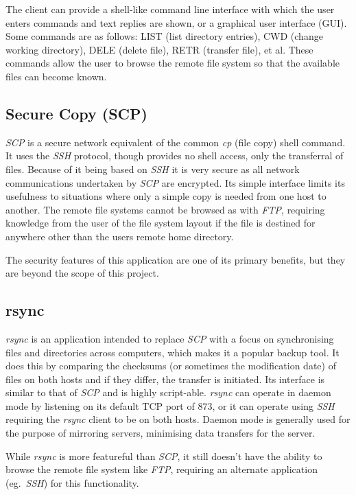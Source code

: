 \documentclass[a4paper]{article}
\begin{document}
The client can provide a shell-like command line interface with which the user enters commands and text replies are shown, or a graphical user interface (GUI). Some commands are as follows: LIST (list directory entries), CWD (change working directory), DELE (delete file), RETR (transfer file), et al. These commands allow the user to browse the remote file system so that the available files can become known.

\subsection{Secure Copy (SCP)}

\textit{SCP} is a secure network equivalent of the common \textit{cp} (file copy) shell command. It uses the \textit{SSH} \cite{rfc4253} protocol, though provides no shell access, only the transferral of files. Because of it being based on \textit{SSH} it is very secure as all network communications undertaken by \textit{SCP} are encrypted. Its simple interface limits its usefulness to situations where only a simple copy is needed from one host to another. The remote file systems cannot be browsed as with \textit{FTP}, requiring knowledge from the user of the file system layout if the file is destined for anywhere other than the users remote home directory.

The security features of this application are one of its primary benefits, but they are beyond the scope of this project.

\subsection{rsync}

\textit{rsync} is an application intended to replace \textit{SCP} with a focus on synchronising files and directories across computers, which makes it a popular backup tool. It does this by comparing the checksums (or sometimes the modification date) of files on both hosts and if they differ, the transfer is initiated. Its interface is similar to that of \textit{SCP} and is highly script-able. \textit{rsync} can operate in daemon mode by listening on its default TCP port of 873, or it can operate using \textit{SSH} requiring the \textit{rsync} client to be on both hosts. Daemon mode is generally used for the purpose of mirroring servers, minimising data transfers for the server.

While \textit{rsync} is more featureful than \textit{SCP}, it still doesn't have the ability to browse the remote file system like \textit{FTP}, requiring an alternate application (eg.\ \textit{SSH}) for this functionality.
\end{document}
